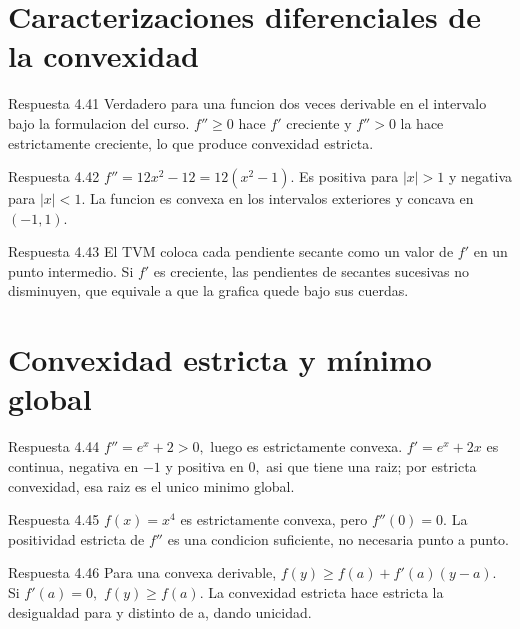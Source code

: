 \documentclass[10pt,a4paper,oneside,openany]{book}
\begin{document}
\section{Caracterizaciones diferenciales de la convexidad}
\begin{PSevenAnswerFixed}{Respuesta 4.41}
Verdadero para una funcion dos veces derivable en el intervalo bajo la formulacion del curso. \(f''\ge 0\) hace \(f'\) creciente y \(f''>0\) la hace estrictamente creciente, lo que produce convexidad estricta.
\end{PSevenAnswerFixed}
\begin{PSevenAnswerFixed}{Respuesta 4.42}
\(f''=12x^{2}-12=12(x^{2}-1)\). Es positiva para \(|x|>1\) y negativa para \(|x|<1\). La funcion es convexa en los intervalos exteriores y concava en \((-1,1)\).
\end{PSevenAnswerFixed}
\begin{PSevenAnswerFixed}{Respuesta 4.43}
El TVM coloca cada pendiente secante como un valor de \(f'\) en un punto intermedio. Si \(f'\) es creciente, las pendientes de secantes sucesivas no disminuyen, que equivale a que la grafica quede bajo sus cuerdas.
\end{PSevenAnswerFixed}
\section{Convexidad estricta y mínimo global}
\begin{PSevenAnswerFixed}{Respuesta 4.44}
\(f''=e^x+2>0,\) luego es estrictamente convexa. \(f'=e^x+2x\) es continua, negativa en \(-1\) y positiva en \(0,\) asi que tiene una raiz; por estricta convexidad, esa raiz es el unico minimo global.
\end{PSevenAnswerFixed}
\begin{PSevenAnswerFixed}{Respuesta 4.45}
\(f(x)=x^{4}\) es estrictamente convexa, pero \(f''(0)=0\). La positividad estricta de \(f''\) es una condicion suficiente, no necesaria punto a punto.
\end{PSevenAnswerFixed}
\begin{PSevenAnswerFixed}{Respuesta 4.46}
Para una convexa derivable, \(f(y)\ge f(a)+f'(a)(y-a)\). Si \(f'(a)=0,\) \(f(y)\ge f(a)\). La convexidad estricta hace estricta la desigualdad para y distinto de a, dando unicidad.
\end{PSevenAnswerFixed}
\end{document}
